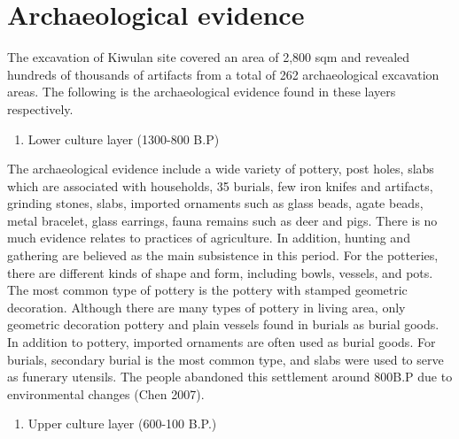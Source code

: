 \documentclass[10pt]{article}
\begin{document}
\section*{Archaeological evidence}\label{archaeological-evidence}

The excavation of Kiwulan site covered an area of 2,800 sqm and revealed
hundreds of thousands of artifacts from a total of 262 archaeological
excavation areas. The following is the archaeological evidence found in
these layers respectively.

\begin{enumerate}
\def\labelenumi{\arabic{enumi}.}
\itemsep1pt\parskip0pt
\item
  Lower culture layer (1300-800 B.P)
\end{enumerate}

The archaeological evidence include a wide variety of pottery, post
holes, slabs which are associated with households, 35 burials, few iron
knifes and artifacts, grinding stones, slabs, imported ornaments such as
glass beads, agate beads, metal bracelet, glass earrings, fauna remains
such as deer and pigs. There is no much evidence relates to practices of
agriculture. In addition, hunting and gathering are believed as the main
subsistence in this period. For the potteries, there are different kinds
of shape and form, including bowls, vessels, and pots. The most common
type of pottery is the pottery with stamped geometric decoration.
Although there are many types of pottery in living area, only geometric
decoration pottery and plain vessels found in burials as burial goods.
In addition to pottery, imported ornaments are often used as burial
goods. For burials, secondary burial is the most common type, and slabs
were used to serve as funerary utensils. The people abandoned this
settlement around 800B.P due to environmental changes (Chen 2007).

\begin{enumerate}
\def\labelenumi{\arabic{enumi}.}
\setcounter{enumi}{1}
\itemsep1pt\parskip0pt
\item
  Upper culture layer (600-100 B.P.)
\end{enumerate}
\end{document}
